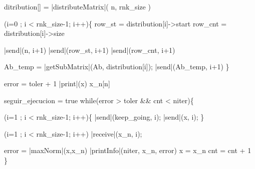 \documentclass{article}
\begin{document}
\begin{program}
    ditribution[] = |distributeMatrix|( n, rnk\_size ) 
\end{program}

\begin{program}
    \FOR (i=0 ; i < rnk\_size-1; i++)\{  
    row\_st = distribution[i]->start
    row\_cnt = distribution[i]->size

    |send|(n, i+1) 
    |send|(row\_st, i+1) 
    |send|(row\_cnt, i+1)
\end{program}

\begin{program}
    Ab\_temp = |getSubMatrix|(Ab, distribution[i]); 
    |send|(Ab\_temp, i+1)                           
    \}
\end{program}

\begin{program}
    error = toler + 1 
    |print|(x)  
    x\_n[n]  
\end{program}

\begin{program}
    seguir\_ejecucion = true 
    while(error > toler \&\& cnt < niter)\{
\end{program}

\begin{program}
    \FOR (i=1 ; i < rnk\_size-1; i++)\{  
    |send|(keep\_going, i); 
    |send|(x, i); 
    \}
\end{program}

\begin{program}
    \FOR (i=1 ; i < rnk\_size-1; i++)  
    |receive|(x\_n, i); 
\end{program}

\begin{program}
    error = |maxNorm|(x,x\_n) 
    |printInfo|(niter, x\_n, error) 
    x = x\_n 
    cnt = cnt + 1
    \}
\end{program}
\end{document}
